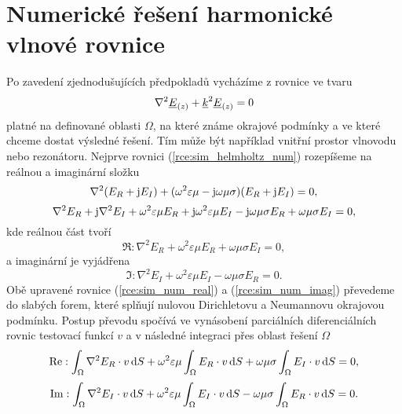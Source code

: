 \section{Numerické řešení harmonické vlnové rovnice}
Po zavedení zjednodušujících předpokladů vycházíme z rovnice ve tvaru
\begin{equation}
	\nabla^{2}{\underline{E}}_{(z)} +{\underline{k}}^{2}{\underline{E}}_{(z)} = 0
	\label{rce:sim_helmholtz_num} 
\end{equation}
platné na definované oblasti $\Omega$, na které známe okrajové podmínky a ve které chceme dostat výsledné řešení. Tím může být například vnitřní prostor vlnovodu nebo rezonátoru. Nejprve rovnici (\ref{rce:sim_helmholtz_num}) rozepíšeme na reálnou a imaginární složku
\begin{displaymath}
	\nabla^{2}(E_R + \mathrm{j} E_I) + (\omega^{2}\varepsilon\mu - \mathrm{j}\omega\mu\sigma)(E_R + \mathrm{j} E_I) = 0,
\end{displaymath}
\begin{displaymath}
	\nabla^{2} E_R + \mathrm{j}\nabla^{2} E_I + \omega^{2}\varepsilon\mu E_R + \mathrm{j}\omega^{2}\varepsilon\mu E_I - \mathrm{j}\omega\mu\sigma E_R + \omega\mu\sigma E_I = 0,
\end{displaymath}
kde reálnou část tvoří
\begin{equation}
	\Re : \nabla^{2} E_R + \omega^{2}\varepsilon\mu E_R + \omega\mu\sigma E_I = 0,
	\label{rce:sim_num_real} 
\end{equation}
a imaginární je vyjádřena
\begin{equation}
	\Im : \nabla^{2} E_I + \omega^{2}\varepsilon\mu E_I - \omega\mu\sigma E_R = 0.
	\label{rce:sim_num_imag} 
\end{equation}
Obě upravené rovnice (\ref{rce:sim_num_real}) a (\ref{rce:sim_num_imag}) převedeme do slabých forem, které splňují nulovou Dirichletovu a Neumannovu okrajovou podmínku. Postup převodu spočívá ve vynásobení parciálních diferenciálních rovnic testovací funkcí $v$ a v následné integraci přes oblast řešení $\Omega$ 
\begin{equation}
	\mathrm{Re} : \int_{\Omega}\nabla^{2} E_R\cdot v \,\mathrm{d} S + \omega^{2}\varepsilon\mu\int_{\Omega} E_R\cdot v\,\mathrm{d} S + \omega\mu\sigma\int_{\Omega} E_I\cdot v\,\mathrm{d} S = 0,
	\label{rce:sim_weak_odv_real} 
\end{equation}
\begin{equation}
	\mathrm{Im} : \int_{\Omega}\nabla^{2} E_I\cdot v\,\mathrm{d} S + \omega^{2}\varepsilon\mu\int_{\Omega} E_I\cdot v\,\mathrm{d} S - \omega\mu\sigma\int_{\Omega} E_R\cdot v\,\mathrm{d} S = 0.
	\label{rce:sim_weak_odv_imag} 
\end{equation}
